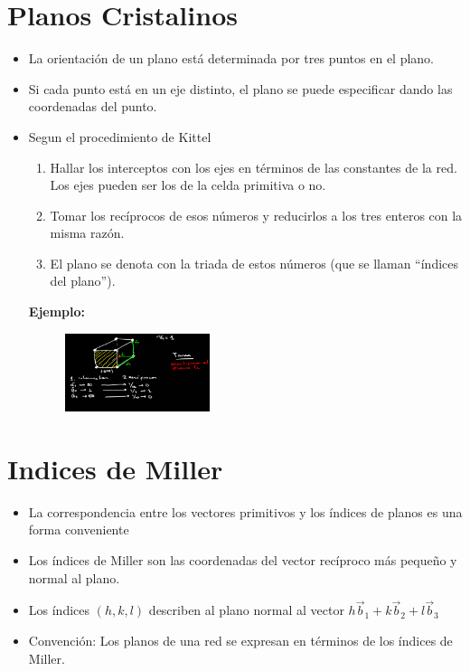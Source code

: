 \section{Planos Cristalinos}

\begin{itemize}
    \item La orientación de un plano está determinada por tres puntos en el plano.
    \item Si cada punto está en un eje distinto, el plano se puede especificar dando las coordenadas del punto.
    \item Segun el procedimiento de Kittel
    \begin{enumerate}
        \item Hallar los interceptos con los ejes en términos de las constantes de la red. Los ejes pueden ser los de la celda primitiva o no.
        \item Tomar los recíprocos de esos números y reducirlos a los tres enteros con la misma razón.
        \item El plano se denota con la triada de estos números (que se llaman ``índices del plano'').
    \end{enumerate}
    \textbf{Ejemplo:}
    \begin{figure}[H]
        \centering
        \includegraphics[width=0.4\textwidth]{Graficas/Aug20-2.png}
    \end{figure}
\end{itemize}


\section{Indices de Miller}

\begin{itemize}
    \item La correspondencia entre los vectores primitivos y los índices de planos es una forma conveniente
    \item Los índices de Miller son las coordenadas del vector recíproco más pequeño y normal al plano.
    \item Los índices $(h,k,l)$ describen al plano normal al vector $h\vec{b}_1+k\vec{b}_2+l\vec{b}_3$
    \item Convención: Los planos de una red se expresan en términos de los índices de Miller.
\end{itemize}

